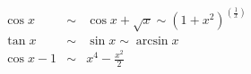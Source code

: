 \begin{eqnarray*}
\cos x &\sim& \cos x +\sqrt x \sim (1+x^2)^(\frac{1}{x})\\
\tan x &\sim& \sin x \sim \arcsin x \\
\cos x -1 &\sim& x^4-\frac{x^2}{2}
\end{eqnarray*}